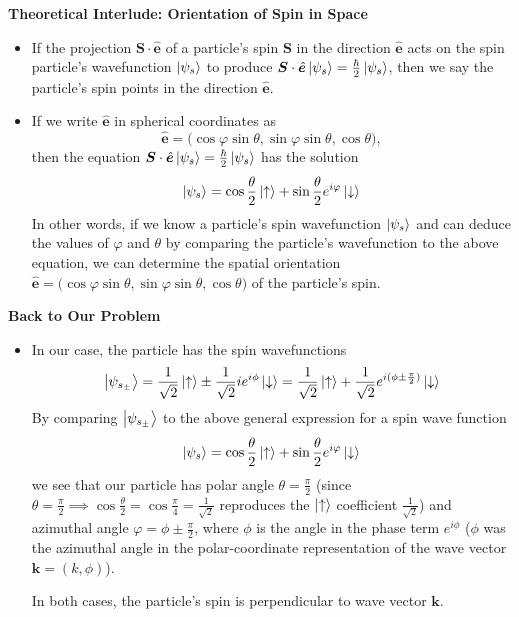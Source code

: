 \documentclass[11pt, a4paper]{article}
\renewcommand{\vec}[1]{\bm{#1}} %
\newcommand{\uvec}[1]{\hat{\vec{#1}}} %
\newcommand{\ua}{\uparrow}  %
\newcommand{\da}{\downarrow}  %
\renewcommand{\k}{\vec{k}}  %
\begin{document}
\textbf{Theoretical Interlude: Orientation of Spin in Space}
\begin{itemize}
	\item If the projection $ \vec{S} \cdot \uvec{e}$ of a particle's spin $ \vec{S} $ in the direction $ \uvec{e} $ acts on the spin particle's wavefunction $ \ket{\psi_{s}} $ to produce $  \vec{S} \cdot \uvec{e} \ket{\psi_{s}} = \frac{\hbar}{2}\ket{\psi_{s}} $, then we say the particle's spin points in the direction $ \uvec{e} $. 
	
	\item If we write $ \uvec{e} $ in spherical coordinates as 
	\begin{equation*}
		\uvec{e} = \big(\cos \varphi \sin \theta, \sin \varphi \sin \theta, \cos \theta\big),
	\end{equation*}
	then the equation $  \vec{S} \cdot \uvec{e} \ket{\psi_{s}} = \frac{\hbar}{2}\ket{\psi_{s}} $ has the solution 
	\begin{equation*}
		\ket{\psi_{s}} = \cos \frac{\theta}{2} \ket{\ua} + \sin \frac{\theta}{2} e^{i\varphi} \ket{\da}
	\end{equation*}
	In other words, if we know a particle's spin wavefunction $ \ket{\psi_{s}} $ and can deduce the values of $ \varphi $ and $ \theta $ by comparing the particle's wavefunction to the above equation, we can determine the spatial orientation $ \uvec{e} = \big(\cos \varphi \sin \theta, \sin \varphi \sin \theta, \cos \theta\big) $  of the particle's spin.
	
\end{itemize}

\textbf{Back to Our Problem}
\begin{itemize}
	\item In our case, the particle has the spin wavefunctions
	\begin{equation*}
		\ket{\psi_{s_{\pm}}} = \frac{1}{\sqrt{2}}\ket{\ua} \pm \frac{1}{\sqrt{2}} ie^{i\phi}\ket{\da} =  \frac{1}{\sqrt{2}}\ket{\ua} + \frac{1}{\sqrt{2}} e^{i(\phi \pm \frac{\pi}{2})}\ket{\da}
	\end{equation*} 
	By comparing $ \ket{\psi_{s_{\pm}}} $ to the above general expression for a spin wave function
	\begin{equation*}
		 \ket{\psi_{s}} = \cos \frac{\theta}{2} \ket{\ua} + \sin \frac{\theta}{2} e^{i\varphi} \ket{\da}
	\end{equation*}
	we see that our particle has polar angle $ \theta = \frac{\pi}{2} $ (since $ \theta = \frac{\pi}{2} \implies \cos \frac{\theta}{2} = \cos \frac{\pi}{4} = \frac{1}{\sqrt{2}} $ reproduces the $ \ket{\ua} $ coefficient $ \frac{1}{\sqrt{2}} $) and azimuthal angle $ \varphi = \phi \pm \frac{\pi}{2} $, where $ \phi $ is the angle in the phase term $ e^{i\phi} $ ($ \phi $ was the azimuthal angle in the polar-coordinate representation of the wave vector $ \k = (k, \phi) $). 
	
	In both cases, the particle's spin is perpendicular to wave vector $ \vec{k} $. 
\end{itemize}
\end{document}
